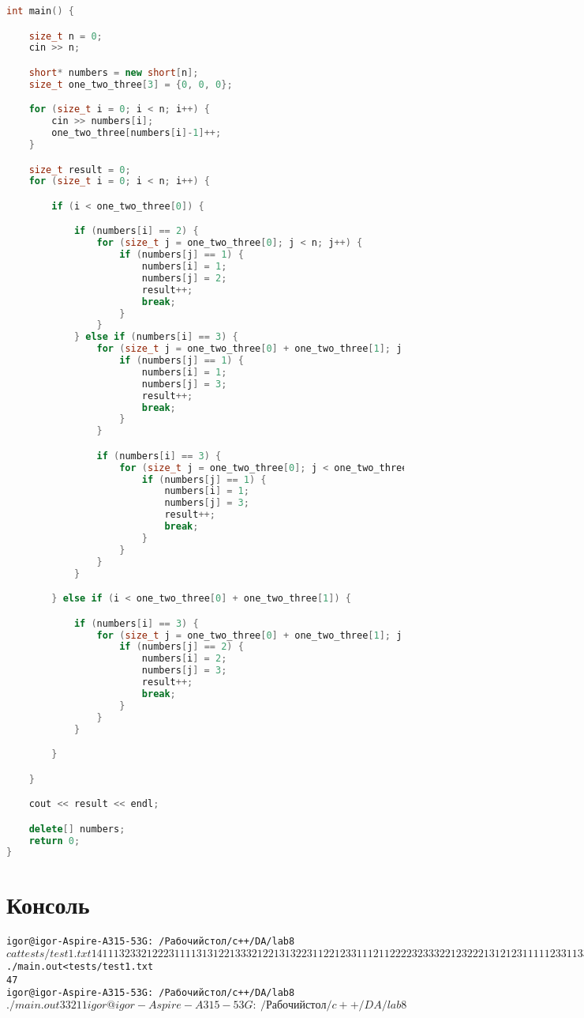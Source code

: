 \begin{lstlisting}[language=c++]
int main() {

	size_t n = 0;
	cin >> n;

	short* numbers = new short[n];
	size_t one_two_three[3] = {0, 0, 0};

	for (size_t i = 0; i < n; i++) {
		cin >> numbers[i];
		one_two_three[numbers[i]-1]++;
	}

	size_t result = 0;
	for (size_t i = 0; i < n; i++) {

		if (i < one_two_three[0]) {

			if (numbers[i] == 2) {
				for (size_t j = one_two_three[0]; j < n; j++) {
					if (numbers[j] == 1) {
						numbers[i] = 1;
						numbers[j] = 2;
						result++;
						break;
					}
				}
			} else if (numbers[i] == 3) {
				for (size_t j = one_two_three[0] + one_two_three[1]; j < n; j++) {
					if (numbers[j] == 1) {
						numbers[i] = 1;
						numbers[j] = 3;
						result++;
						break;
					}
				}

				if (numbers[i] == 3) {
					for (size_t j = one_two_three[0]; j < one_two_three[0] + one_two_three[1]; j++) {
						if (numbers[j] == 1) {
							numbers[i] = 1;
							numbers[j] = 3;
							result++;
							break;
						}
					}
				}
			}

		} else if (i < one_two_three[0] + one_two_three[1]) {

			if (numbers[i] == 3) {
				for (size_t j = one_two_three[0] + one_two_three[1]; j < n; j++) {
					if (numbers[j] == 2) {
						numbers[i] = 2;
						numbers[j] = 3;
						result++;
						break;
					}
				}
			}

		}

	}

	cout << result << endl;

	delete[] numbers;
	return 0;
}
\end{lstlisting}

\pagebreak

\section{Консоль}
\begin{alltt}
igor@igor-Aspire-A315-53G:~/Рабочий стол/c++/DA/lab8$ cat tests/test1.txt
141
1 1 3 2 3 3 2 1 2 2 2 3 1 1 1 1 3 1 3 1 2 2 1 3 3 3 2 1 2 2 1 3 1 3 2 2 3 1 1 2 2 1 2 3 3 1 1 1 2 1 1 2 2 2 2 3 2 3 3 3 2 2 1 2 3 2 2 2 1 3 1 2 1 2 3 1 1 1 1 1 2 3 3 1 1 3 3 1 1 3 3 3 3 2 3 2 2 1 3 1 2 2 1 2 3 1 2 3 2 1 3 1 3 2 2 2 2 1 1 2 2 3 3 2 1 2 1 2 2 2 2 3 1 1 1 1 3 3 1 1 2
igor@igor-Aspire-A315-53G:~/Рабочий стол/c++/DA/lab8$ ./main.out < tests/test1.txt
47
igor@igor-Aspire-A315-53G:~/Рабочий стол/c++/DA/lab8$ ./main.out
3
3 2 1
1
igor@igor-Aspire-A315-53G:~/Рабочий стол/c++/DA/lab8$
\end{alltt}
\pagebreak
